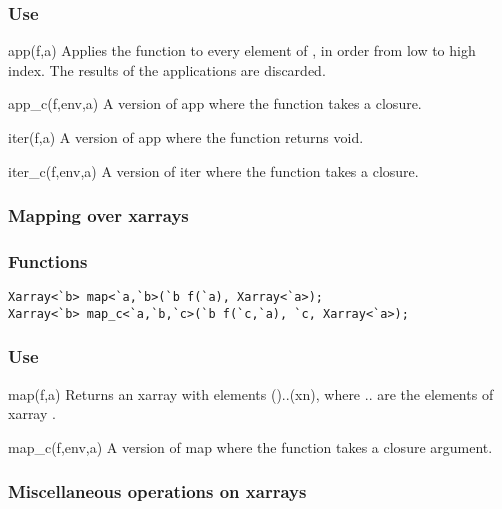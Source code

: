 \subsubsection*{Use}

\begin{defun}{app}{(f,a)}
Applies the function  to every element of , in order from
low to high index.  The results of the applications are discarded.
\end{defun}

\begin{defun}{app_c}{(f,env,a)}
A version of app where the function  takes a closure.
\end{defun}

\begin{defun}{iter}{(f,a)}
A version of app where the function  returns void.
\end{defun}

\begin{defun}{iter_c}{(f,env,a)}
A version of iter where the function  takes a closure.
\end{defun}

\subsubsection*{Mapping over xarrays}
\subsubsection*{Functions}
\begin{verbatim}
Xarray<`b> map<`a,`b>(`b f(`a), Xarray<`a>);
Xarray<`b> map_c<`a,`b,`c>(`b f(`c,`a), `c, Xarray<`a>);
\end{verbatim}

\subsubsection*{Use}

\begin{defun}{map}{(f,a)}
Returns an xarray with elements ()..(xn), where
.. are the elements of xarray .
\end{defun}

\begin{defun}{map_c}{(f,env,a)}
A version of map where the function  takes a closure argument.
\end{defun}

\subsubsection*{Miscellaneous operations on xarrays}
